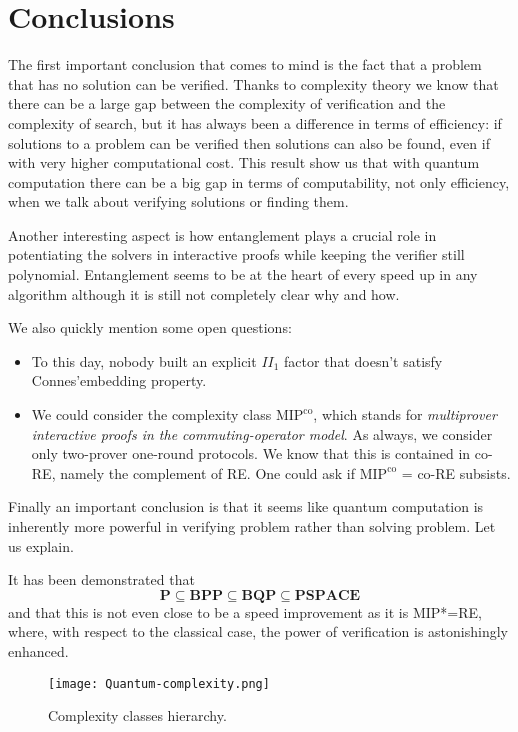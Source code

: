 \section*{Conclusions}

The first important conclusion that comes to mind is the fact that a problem that has no solution can be verified. Thanks to complexity theory we know that there can be a large gap between the complexity of verification and the complexity of search, but it has always been a difference in terms of efficiency: if solutions to a problem can be verified then solutions can also be found, even if with very higher computational cost. This result show us that with quantum computation there can be a big gap in terms of computability, not only efficiency, when we talk about verifying solutions or finding them.

\quad 

Another interesting aspect is how entanglement plays a crucial role in potentiating the solvers in interactive proofs while keeping the verifier still polynomial. Entanglement seems to be at the heart of every speed up in any algorithm although it is still not completely clear why and how.

\quad 

We also quickly mention some open questions:
\begin{itemize}

    \item To this day, nobody built an explicit $II_1$ factor that doesn't satisfy Connes'embedding property.
    \item We could consider the complexity class $\text{MIP}^\text{co}$, which stands for \emph{multiprover interactive proofs in the commuting-operator model}. As always, we consider only two-prover one-round protocols. We know that this is contained in co-RE, namely the complement of RE. One could ask if $\text{MIP}^\text{co}$ = co-RE subsists.
    
\end{itemize}

\quad 

Finally an important conclusion is that it seems like quantum computation is inherently more powerful in verifying problem rather than solving problem. Let us explain.

It has been demonstrated that
\begin{equation*}
   \textbf{P}   \subseteq \textbf{BPP} \subseteq \textbf{BQP}  \subseteq \textbf{PSPACE}
\end{equation*}
and that this is not even close to be a speed improvement  as it is MIP*=RE, where, with respect to the classical case, the power of verification is astonishingly enhanced.


\begin{figure}[h]
    \texttt{[image: Quantum-complexity.png]}
    \centering
    \caption{Complexity classes hierarchy.}
    \end{figure}